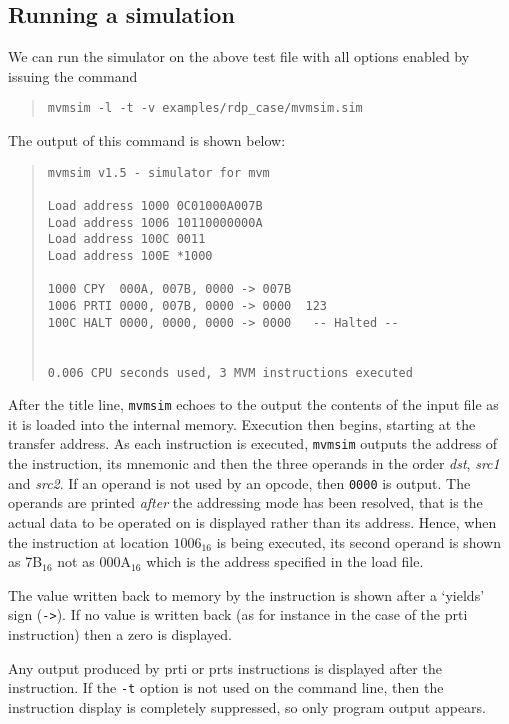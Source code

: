 \subsection{Running a simulation}
\label{mvmsim.sim}
We can run the simulator on the above test file with all options enabled by issuing
the command
\begin{quote}
\small
\begin{verbatim}
mvmsim -l -t -v examples/rdp_case/mvmsim.sim 
\end{verbatim}
\end{quote}

The output of this command is shown below:

\begin{quote}
\small
\begin{verbatim}
mvmsim v1.5 - simulator for mvm

Load address 1000 0C01000A007B
Load address 1006 10110000000A
Load address 100C 0011
Load address 100E *1000

1000 CPY  000A, 007B, 0000 -> 007B  
1006 PRTI 0000, 007B, 0000 -> 0000  123
100C HALT 0000, 0000, 0000 -> 0000   -- Halted --


0.006 CPU seconds used, 3 MVM instructions executed
\end{verbatim}
\end{quote}

After the title line, {\tt mvmsim} echoes to the output the contents of
the input file as it is loaded into the internal memory. Execution then
begins, starting at the transfer address.  As each instruction is
executed, {\tt mvmsim} outputs the address of the instruction, its
mnemonic and then the three operands in the order {\em dst}, {\em src1}
and {\em src2}. If an operand is not used by an opcode, then {\tt 0000}
is output. The operands are printed {\em after} the addressing mode has
been resolved, that is the actual data to be operated on is displayed
rather than its address. Hence, when the instruction at location
$1006_{16}$ is being executed, its second operand is shown as 7B$_{16}$
not as 000A$_{16}$ which is the address specified in the load file. 

The value written back to memory by the instruction is shown after a
`yields' sign
(\verb+->+). If no value is written back (as for instance
in the case of the {\sc prti} instruction)  then a zero is displayed. 

Any output produced by {\sc prti} or {\sc prts} instructions is
displayed after the instruction. If the {\tt -t} option is not used on
the command line, then the instruction display is completely suppressed,
so only program output appears.

